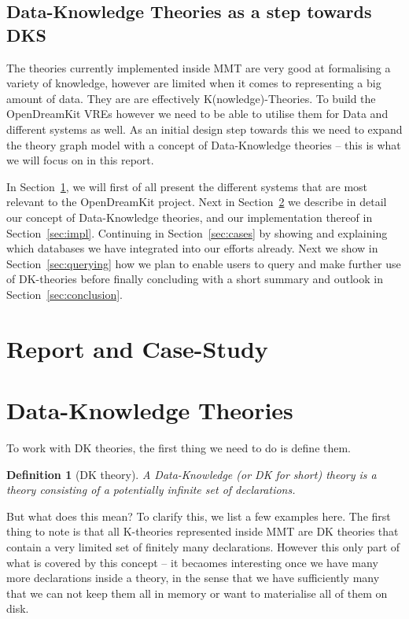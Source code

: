 \documentclass{deliverablereport}
\newtheorem{mydef}{Definition}
\begin{document}
\subsection{Data-Knowledge Theories as a step towards DKS}\label{sec:introfinal}

The theories currently implemented inside MMT are very good at formalising a variety of knowledge, however are limited when it comes to representing a big amount of data. They are are effectively K(nowledge)-Theories. To build the OpenDreamKit VREs however we need to be able to utilise them for Data and different systems as well. As an initial design step towards this we need to expand the theory graph model with a concept of Data-Knowledge theories -- this is what we will focus on in this report.

In Section~\ref{casestudy}, we will first of all present the different systems that are most relevant to the OpenDreamKit project. Next in Section~\ref{sec:data} we describe in detail our concept of Data-Knowledge theories, and our implementation thereof in Section~\ref{sec:impl}. Continuing in Section~\ref{sec:cases} by showing and explaining which databases we have integrated into our efforts already. Next we show in Section~\ref{sec:querying} how we plan to enable users to query and make further use of DK-theories before finally concluding with a short summary and outlook in Section~\ref{sec:conclusion}.

\section{Report and Case-Study}\label{casestudy}

\section{Data-Knowledge Theories}\label{sec:data}

To work with DK theories, the first thing we need to do is define them.
\begin{mydef}[DK theory]
  A Data-Knowledge (or DK for short) theory is a theory consisting of a potentially infinite set of declarations.
\end{mydef}

But what does this mean? To clarify this, we list a few examples here. The first thing to note is that all K-theories represented inside MMT are DK theories that contain a very limited set of finitely many declarations. However this only part of what is covered by this concept -- it becaomes interesting once we have many more declarations inside a theory, in the sense that we have sufficiently many that we can not keep them all in memory or want to materialise all of them on disk.
\end{document}
